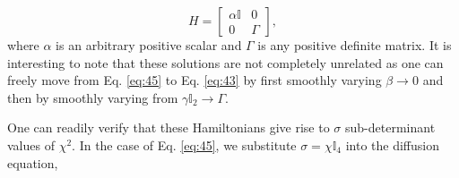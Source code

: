 \documentclass[11pt,a4paper]{article}
\numberwithin{equation}{section}
\begin{document}
	\begin{equation}\label{eq:43}		
	H =
	\left[
	\begin{array}{c|c}
	\alpha \mathbb{I} & 0 \\
	\hline
	0 & \Gamma
	\end{array}
	\right],
	\end{equation}where $\alpha$ is an arbitrary positive scalar and $\Gamma$ is any positive definite matrix. It is interesting to note that these solutions are not completely unrelated as one can freely move from Eq. \ref{eq:45} to Eq. \ref{eq:43} by first smoothly varying $\beta \rightarrow 0$ and then by smoothly varying from $\gamma \mathbb{I}_2 \rightarrow \Gamma$.
	
	One can readily verify that these Hamiltonians give rise to $\sigma$ sub-determinant values of $\chi^2$. In the case of Eq. \ref{eq:45}, we substitute $\sigma=\chi\mathbb{I}_4$ into the diffusion equation,
	
\end{document}
